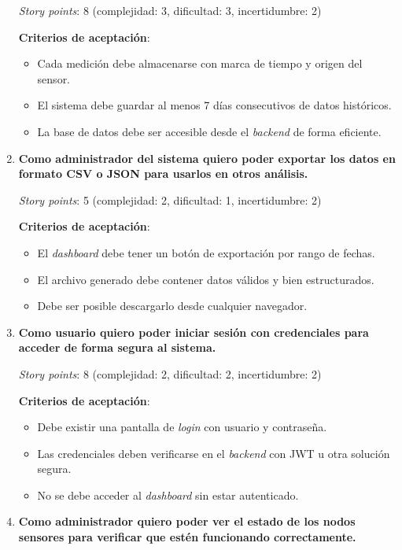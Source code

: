 \documentclass[
11pt, %
]{charter}
\begin{document}
\begin{enumerate}
    \textit{Story points}: 8 (complejidad: 3, dificultad: 3, incertidumbre: 2)

    \textbf{Criterios de aceptación}:
    \begin{itemize}
        \item Cada medición debe almacenarse con marca de tiempo y origen del sensor.
        \item El sistema debe guardar al menos 7 días consecutivos de datos históricos.
        \item La base de datos debe ser accesible desde el \textit{backend} de forma eficiente.
    \end{itemize}

    \item \textbf{Como administrador del sistema quiero poder exportar los datos en formato CSV o JSON para usarlos en otros análisis.}

    \textit{Story points}: 5 (complejidad: 2, dificultad: 1, incertidumbre: 2)

    \textbf{Criterios de aceptación}:
    \begin{itemize}
        \item El \textit{dashboard} debe tener un botón de exportación por rango de fechas.
        \item El archivo generado debe contener datos válidos y bien estructurados.
        \item Debe ser posible descargarlo desde cualquier navegador.
    \end{itemize}

    \item \textbf{Como usuario quiero poder iniciar sesión con credenciales para acceder de forma segura al sistema.}

    \textit{Story points}: 8 (complejidad: 2, dificultad: 2, incertidumbre: 2)

    \textbf{Criterios de aceptación}:
    \begin{itemize}
        \item Debe existir una pantalla de \textit{login} con usuario y contraseña.
        \item Las credenciales deben verificarse en el \textit{backend} con JWT u otra solución segura.
        \item No se debe acceder al \textit{dashboard} sin estar autenticado.
    \end{itemize}

    \item \textbf{Como administrador quiero poder ver el estado de los nodos sensores para verificar que estén funcionando correctamente.}


\end{enumerate}
\end{document}
